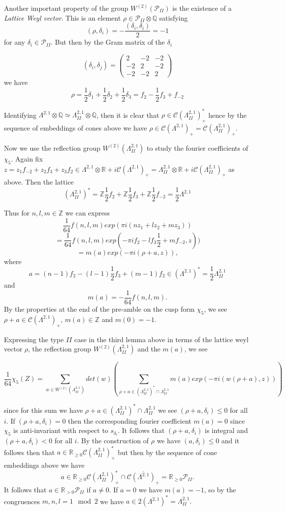 \documentclass[9pt]{amsart} \usepackage[utf8]{inputenc}
\newcommand{\Q}{\mathbb{Q}}
\newcommand{\Z}{\mathbb{Z}} \newcommand{\C}{\mathbb{C}}
\newcommand{\R}{\mathbb{R}} \newcommand{\La}{\Lambda}
\newcommand{\Cone}{\mathcal{C}}
\newcommand{\Poly}{\mathcal{P}}
\begin{document}
Another important property of the group $W^{(2)}(\Poly_{II})$ is the
existence of a \textit{Lattice Weyl vector}. This is an element $\rho
\in \Poly_{II} \otimes \Q$ satisfying $$(\rho, \delta_i) =
-\frac{(\delta_i,\delta_i)}{2} = -1$$ for any $\delta_i \in \Poly_{II}.$
But then by the Gram matrix of the $\delta_i$

$$(\delta_i,\delta_j) = \begin{pmatrix}2 & -2 & -2\\-2 & 2 & -2\\-2 & -2
& 2\end{pmatrix}$$
we have $$\rho = \frac{1}{2}\delta_1 + \frac{1}{2}\delta_2 +
\frac{1}{2}\delta_3 = f_2 - \frac{1}{2}f_3 + f_{-2}$$

Identifying $\La^{2,1}\otimes \Q \simeq \La^{2,1}_{II} \otimes \Q$,
then it is clear that $\rho \in \Cone(\La^{2,1}_{II})_+^*$ hence
by the sequence of embeddings of cones above we have $\rho \in
\Cone(\La^{2,1})_+ = \Cone(\La^{2,1}_{II})_+$.


Now we use the reflection group $W^{(2)}(\La^{2,1}_{II})$ to study the
fourier coefficients of $\chi_5$. Again fix  $z = z_1 f_{-2} + z_2 f_3 +
z_3 f_2 \in \La^{2,1} \otimes \R + i\Cone(\La^{2,1})_+ = \La^{2,1}_{II}
\otimes \R + i\Cone(\La^{2,1}_{II})_+$ as above. Then the lattice
$$(\La^{2,1}_{II})^* = \Z \frac{1}{2} f_2 + \Z \frac{1}{2} f_3 + \Z
\frac{1}{2} f_{-2} = \frac{1}{2}\La^{2,1}$$



Thus for $n,l,m \in \Z$ we can express $$\frac{1}{64}f(n,l,m)exp(\pi i
(n z_1 + lz_2 + m z_3)) $$ $$= \frac{1}{64} f(n,l,m) exp(- \pi i f_2 - l f_3
\frac{1}{2} + mf_{-2}, z))$$
$$= m(a) exp (-\pi i(\rho +a, z)),$$
where $$a = (n-1) f_2 - (l-1)\frac{1}{2} f_3 + (m-1) f_2 \in (\La^{2,1})^*
= \frac{1}{2} \La^{2,1}_{II}$$ and $$m(a) = -\frac{1}{64} f(n,l,m).$$ By
the properties at the end of the pre-amble on the cusp form $\chi_5$, we
see $\rho + a \in \Cone(\La^{2,1})_+$, $m(a) \in \Z$ and $m(0) = -1$.

Expressing the type $II$ case in the third lemma above in terms of the
lattice weyl vector $\rho$, the reflection group
$W^{(2)}(\La^{2,1}_{II})$ and the $m(a)$, we see

$$\frac{1}{64} \chi_5(Z) = \sum_{w \in W^{(2)}(\La^{2,1}_{II})} det(w) (
\sum_{\rho +a \in (\La^{2,1}_{II})^* \cap \La^{2,1}_{II}} m(a) exp(-\pi
i(w(\rho +a), z) ))$$

since for this sum we have $\rho +a \in (\La^{2,1}_{II})^* \cap
\La^{2,1}_{II}$ we see $(\rho +a, \delta_i) \leq 0$ for all $i$. If
$(\rho + a, \delta_i) = 0$ then the corresponding fourier coefficient
$m(a) = 0$ since $\chi_5$ is anti-invariant with respect to
$s_{\delta_i}$. It follows that $(\rho +a, \delta_i)$ is integral and
$(\rho +a, \delta_i) < 0$ for all $i$. By the construction of $\rho$ we
have $(a, \delta_i) \leq 0$ and it follows then that $a \in \R_{\geq 0}
\Cone(\La^{2,1}_{II})^*_+$ but then by the sequence of cone embeddings
above we have $$a \in \R_{\geq 0} \Cone(\La^{2,1}_{II})_+^* \cap
\overline{\Cone(\La^{2,1})_+} = \R_{\geq 0} \Poly_{II}.$$ It follows
that $a \in \R_{>0}\Poly_{II}$ if $a \neq 0$. If $a = 0$ we have $m(a) =
-1$, so by the congruences $m,n,l = 1 \mod 2$ we have $a \in 2
(\La^{2,1})^* = \La^{2,1}_{II}.$
\end{document}
